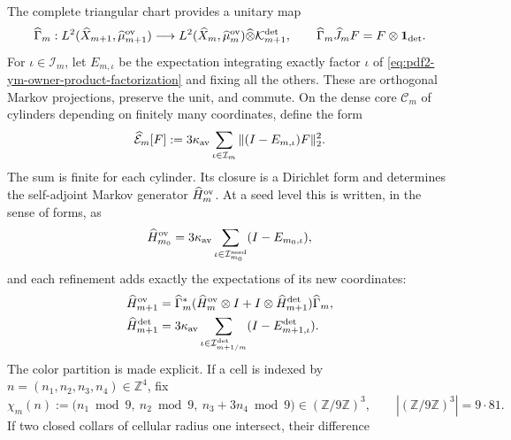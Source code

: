 The complete triangular chart provides a unitary map
\begin{equation}\label{eq:pdf2-ym-owner-triangular-unitary}
 \widehat\Gamma_m:
 L^2(\widehat X_{m+1},\widehat\mu_{m+1}^{\rm ov})
 \longrightarrow
 L^2(\widehat X_m,\widehat\mu_m^{\rm ov})
 \widehat\otimes\mathcal K_{m+1}^{\rm det},
 \qquad
 \widehat\Gamma_m\widehat J_mF=F\otimes\mathbf1_{\rm det}.
\end{equation}
For $\iota\in\mathcal I_m$, let $E_{m,\iota}$ be the expectation integrating
exactly factor $\iota$ of
\eqref{eq:pdf2-ym-owner-product-factorization} and fixing all the others.
These are orthogonal Markov projections, preserve the unit, and commute. On the
dense core $\mathscr C_m$ of cylinders depending on finitely many
coordinates, define the form
\begin{equation}\label{eq:pdf2-ym-owner-full-form}
 \widehat{\mathcal E}_m[F]
 :=3\kappa_{\rm av}\sum_{\iota\in\mathcal I_m}
   \|(I-E_{m,\iota})F\|_2^2.
\end{equation}
The sum is finite for each cylinder. Its closure is a Dirichlet form and
determines the self-adjoint Markov generator
$\widehat H_m^{\rm ov}$. At a seed level this is written, in the sense of
forms, as
\begin{equation}\label{eq:pdf2-ym-owner-base-generator}
 \widehat H_{m_0}^{\rm ov}
 =3\kappa_{\rm av}
  \sum_{\iota\in\mathcal I_{m_0}^{\rm seed}}(I-E_{m_0,\iota}),
\end{equation}
and each refinement adds exactly the expectations of its new coordinates:
\begin{equation}\label{eq:pdf2-ym-owner-refined-generator}
 \begin{aligned}
 \widehat H_{m+1}^{\rm ov}
 &=\widehat\Gamma_m^*
   (\widehat H_m^{\rm ov}\otimes I
    +I\otimes\widehat H_{m+1}^{\rm det})\widehat\Gamma_m,\\
 \widehat H_{m+1}^{\rm det}
 &=3\kappa_{\rm av}
   \sum_{\iota\in\mathcal I_{m+1/m}^{\rm det}}
   (I-E_{m+1,\iota}^{\rm det}).
 \end{aligned}
\end{equation}
The color partition is made explicit. If a cell is indexed by
$n=(n_1,n_2,n_3,n_4)\in\mathbb Z^4$, fix
\begin{equation}\label{eq:pdf2-ym-owner-729-coloring}
 \chi_m(n):=
 \bigl(n_1\bmod9,\ n_2\bmod9,\ n_3+3n_4\bmod9\bigr)
 \in(\mathbb Z/9\mathbb Z)^3,
 \qquad |(\mathbb Z/9\mathbb Z)^3|=9\cdot81.
\end{equation}
If two closed collars of cellular radius one intersect, their difference
